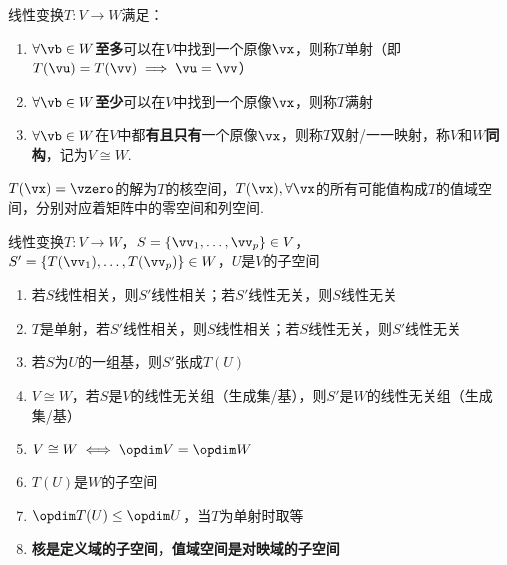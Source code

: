 \begin{definition}[单射与满射]
线性变换$T:V\to W$满足：
\begin{enumerate}
	\item $\forall\vb\in W$\textbf{至多}可以在$V$中找到一个原像$\vx$，则称$T$单射（即$T(\vu)=T(\vv)\implies \vu=\vv$）
	\item $\forall\vb\in W$\textbf{至少}可以在$V$中找到一个原像$\vx$，则称$T$满射
	\item $\forall\vb\in W$在$V$中都\textbf{有且只有}一个原像$\vx$，则称$T$双射/一一映射，称$V$和$W$\textbf{同构}，记为$V\cong W$.
\end{enumerate}
\end{definition}
\begin{definition}[核空间与值域空间]
$T(\vx)=\vzero$的解为$T$的核空间，$T(\vx),\forall\vx$的所有可能值构成$T$的值域空间，分别对应着矩阵中的零空间和列空间.
\end{definition}
\begin{theorem}%
\label{lt_theo}
线性变换$T:V\to W$，$S=\{\vv_1,\dots,\vv_p\}\in V$，$S'=\{T(\vv_1),\dots,T(\vv_p)\}\in W$，$U$是$V$的子空间
\begin{enumerate}
	\item \label{l1}若$S$线性相关，则$S'$线性相关；若$S'$线性无关，则$S$线性无关
	\item \label{l2}$T$是单射，若$S'$线性相关，则$S$线性相关；若$S$线性无关，则$S'$线性无关
	\item \label{l3}若$S$为$U$的一组基，则$S'$张成$T(U)$
	\item \label{l4}$V\cong W$，若$S$是$V$的线性无关组（生成集/基），则$S'$是$W$的线性无关组（生成集/基）
	\item $V\cong W\iff\opdim V=\opdim W$
	\item \label{subspace_range}$T(U)$是$W$的子空间
	\item $\opdim T(U)\leq\opdim U$，当$T$为单射时取等
	\item \textbf{核是定义域的子空间}，\textbf{值域空间是对映域的子空间}
\end{enumerate}
\end{theorem}
